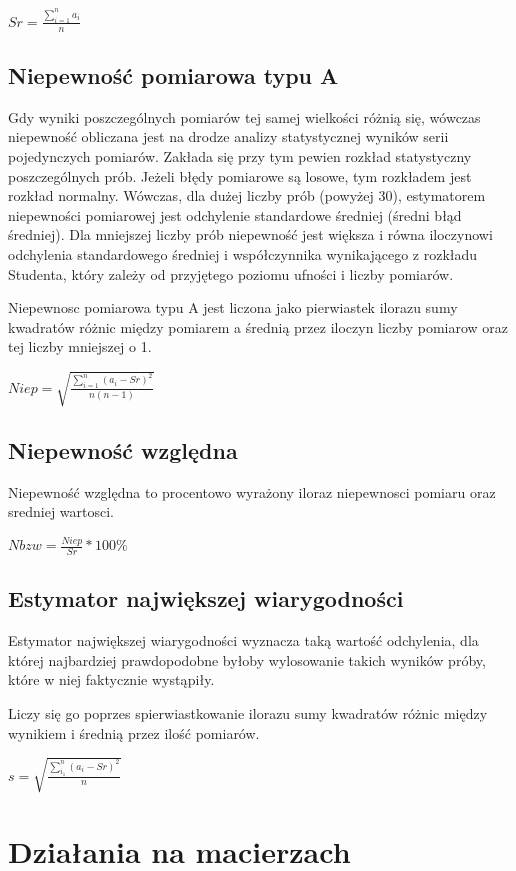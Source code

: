 \documentclass[11pt]{article}
\begin{document}
\(  Sr = \frac{\sum_{i = 1}^{n} a_i}{n}  \)

\subsection{Niepewność pomiarowa typu A}

Gdy wyniki poszczególnych pomiarów tej samej wielkości różnią się, wówczas niepewność obliczana jest na drodze analizy statystycznej wyników serii pojedynczych pomiarów. Zakłada się przy tym pewien rozkład statystyczny poszczególnych prób. Jeżeli błędy pomiarowe są losowe, tym rozkładem jest rozkład normalny. Wówczas, dla dużej liczby prób (powyżej 30), estymatorem niepewności pomiarowej jest odchylenie standardowe średniej (średni błąd średniej). Dla mniejszej liczby prób niepewność jest większa i równa iloczynowi odchylenia standardowego średniej i współczynnika wynikającego z rozkładu Studenta, który zależy od przyjętego poziomu ufności i liczby pomiarów.

Niepewnosc pomiarowa typu A jest liczona jako pierwiastek ilorazu sumy kwadratów różnic między pomiarem a średnią przez iloczyn liczby pomiarow oraz tej liczby mniejszej o 1.

\( Niep = \sqrt{\frac{\sum_{i = 1}^{n} (a_i - Sr)^2}{n(n-1)}} \)

\subsection{Niepewność względna}

Niepewność względna to procentowo wyrażony iloraz niepewnosci pomiaru oraz sredniej wartosci.

\( Nbzw = \frac{Niep}{Sr} * 100\% \)

\subsection{Estymator największej wiarygodności}

Estymator największej wiarygodności wyznacza taką wartość odchylenia, dla której najbardziej prawdopodobne byłoby wylosowanie takich wyników próby, które w niej faktycznie wystąpiły.

Liczy się go poprzes spierwiastkowanie ilorazu sumy kwadratów różnic między wynikiem i średnią przez ilość pomiarów.

\( s = \sqrt{\frac{\sum_{i_1}^{n} (a_i - Sr)^2}{n}} \)

\section{Działania na macierzach}
\end{document}
